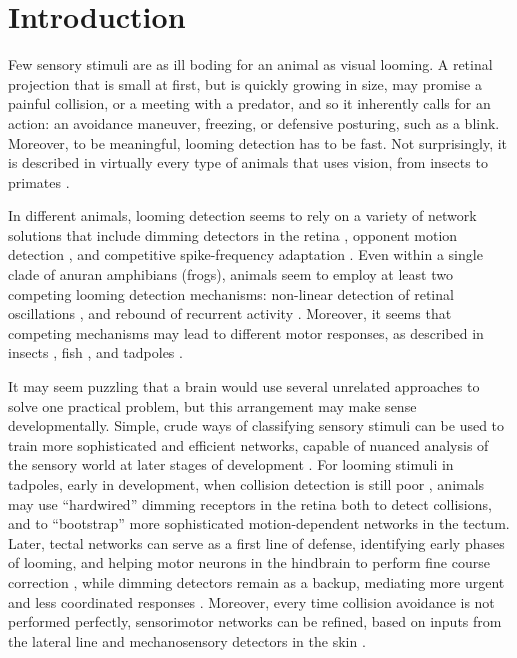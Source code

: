 \documentclass{article}
\begin{document}
\section*{Introduction}

Few sensory stimuli are as ill boding for an animal as visual looming. A retinal projection that is small at first, but is quickly growing in size, may promise a painful collision, or a meeting with a predator, and so it inherently calls for an action: an avoidance maneuver, freezing, or defensive posturing, such as a blink. Moreover, to be meaningful, looming detection has to be fast. Not surprisingly, it is described in virtually every type of animals that uses vision, from insects to primates \citep{Pereira2016}.

In different animals, looming detection seems to rely on a variety of network solutions \citep{frost2004review} that include dimming detectors in the retina \citep{ishikane2005,munch2009}, opponent motion detection \citep{klapoetke2017looming}, and competitive spike-frequency adaptation \citep{peron2009adaptation,fotowat2011multiplexing}. Even within a single clade of anuran amphibians (frogs), animals seem to employ at least two competing looming detection mechanisms: non-linear detection of retinal oscillations \citep{baranauskas2012}, and rebound of recurrent activity \citep{khakhalin2014,jang2016}. Moreover, it seems that competing mechanisms may lead to different motor responses, as described in insects \citep{card2008tradeoffs,chan2013avoidance}, fish \citep{burgess2007twoescapes,portugues2009behaviors,budick2000repertoire,temizer2015pathway,bhattacharyya2017assessment}, and tadpoles \citep{khakhalin2014}.

It may seem puzzling that a brain would use several unrelated approaches to solve one practical problem, but this arrangement may make sense developmentally. Simple, crude ways of classifying sensory stimuli can be used to train more sophisticated and efficient networks, capable of nuanced analysis of the sensory world at later stages of development \citep{marblestone2016deeplearning}. For looming stimuli in tadpoles, early in development, when collision detection is still poor \citep{dong2009}, animals may use “hardwired” dimming receptors in the retina \citep{baranauskas2012} both to detect collisions, and to “bootstrap” more sophisticated motion-dependent networks in the tectum. Later, tectal networks can serve as a first line of defense, identifying early phases of looming, and helping motor neurons in the hindbrain to perform fine course correction \citep{khakhalin2014,bhattacharyya2017assessment}, while dimming detectors remain as a backup, mediating more urgent and less coordinated responses \citep{khakhalin2014}. Moreover, every time collision avoidance is not performed perfectly, sensorimotor networks can be refined, based on inputs from the lateral line and mechanosensory detectors in the skin \citep{felch2016, helmbrecht2018topography}.
\end{document}
